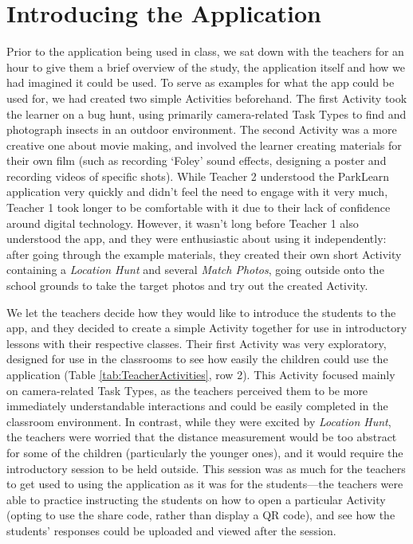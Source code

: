 \section{Introducing the Application}

Prior to the application being used in class, we sat down with the teachers for an hour to give them a brief overview of the study, the application itself and how we had imagined it could be used. To serve as examples for what the app could be used for, we had created two simple Activities beforehand. The first Activity took the learner on a bug hunt, using primarily camera-related Task Types to find and photograph insects in an outdoor environment. The second Activity was a more creative one about movie making, and involved the learner creating materials for their own film (such as recording `Foley' sound effects, designing a poster and recording videos of specific shots). While Teacher 2 understood the ParkLearn application very quickly and didn't feel the need to engage with it very much, Teacher 1 took longer to be comfortable with it due to their lack of confidence around digital technology. However, it wasn't long before Teacher 1 also understood the app, and they were enthusiastic about using it independently: after going through the example materials, they created their own short Activity containing a \textit{Location Hunt} and several \textit{Match Photos}, going outside onto the school grounds to take the target photos and try out the created Activity. 

We let the teachers decide how they would like to introduce the students to the app, and they decided to create a simple Activity together for use in introductory lessons with their respective classes. Their first Activity was very exploratory, designed for use in the classrooms to see how easily the children could use the application (Table \ref{tab:TeacherActivities}, row 2). This Activity focused mainly on camera-related Task Types, as the teachers perceived them to be more immediately understandable interactions and could be easily completed in the classroom environment. In contrast, while they were excited by \textit{Location Hunt}, the teachers were worried that the distance measurement would be too abstract for some of the children (particularly the younger ones), and it would require the introductory session to be held outside. This session was as much for the teachers to get used to using the application as it was for the students---the teachers were able to practice instructing the students on how to open a particular Activity (opting to use the share code, rather than display a QR code), and see how the students' responses could be uploaded and viewed after the session.

